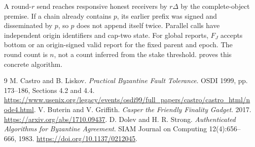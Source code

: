 \documentclass[11pt,a4paper,onecolumn]{article}
\theoremstyle{remark}\newtheorem{example}[definition]{Example}
\begin{document}
A round-$r$ send reaches responsive honest receivers by $r\Delta$ by the
complete-object premise. If a chain already contains $p$, its earlier prefix
was signed and disseminated by $p$, so $p$ does not append itself twice.
Parallel calls have independent origin identifiers and cap-two state. For
global reports, $F_J$ accepts bottom or an origin-signed valid report
for the fixed parent and epoch. The round count is $n$, not a count inferred
from the stake threshold.  proves this concrete algorithm.


\begin{thebibliography}{9}\small
\setlength{\itemsep}{2pt}
 M. Castro and B. Liskov.
\emph{Practical Byzantine Fault Tolerance}. OSDI 1999, pp. 173--186,
Sections 4.2 and 4.4.
\url{https://www.usenix.org/legacy/events/osdi99/full_papers/castro/castro_html/node4.html}.
 V. Buterin and V. Griffith.
\emph{Casper the Friendly Finality Gadget}. 2017.
\url{https://arxiv.org/abs/1710.09437}.
 D. Dolev and H. R. Strong.
\emph{Authenticated Algorithms for Byzantine Agreement}.
SIAM Journal on Computing 12(4):656--666, 1983.
\url{https://doi.org/10.1137/0212045}.

\end{thebibliography}
\end{document}

